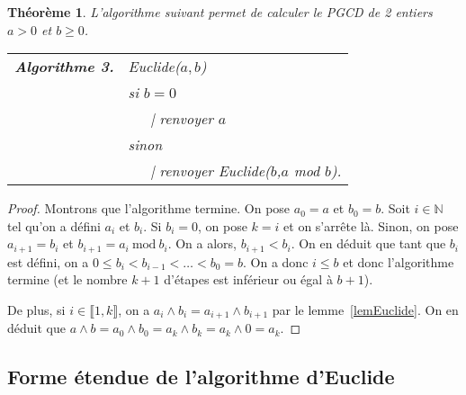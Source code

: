 \documentclass[12pt]{report}
\newtheorem*{qst}{Question}
\newtheorem*{rep}{Réponse}
\newtheorem{thm}{Théorème}[chapter]
\newcommand{\N}{\mathbb{N}}
\begin{document}
\begin{thm}\label{thmAlgorithme_d_euclide}
L'algorithme suivant permet de calculer le PGCD de 2 entiers $a>0$ et $b \geq 0$.\\

\begin{tabular}{ll}
\textbf{Algorithme 3.} & Euclide($a,b$)\\
 & si $b=0$     \\
 & \ \ \ {\rm |} renvoyer $a$  \\
 & sinon   \\ 
 & \ \ \ {\rm |  } renvoyer Euclide($b$,$a$ mod $b$).
\end{tabular}
\end{thm}

\begin{proof}
Montrons que l'algorithme termine. On pose $a_0=a$ et $b_0=b$. Soit $i\in \N$ tel qu'on a défini $a_i$ et $b_i$. Si $b_i=0$, on pose $k=i$ et on s'arrête là. Sinon, on pose $a_{i+1}=b_i$ et $b_{i+1}=a_i\mathrm{\ mod\ }b_i$. On a alors, $b_{i+1}< b_i$. On en déduit que tant que $b_i$ est défini, on a $0\leq b_i<b_{i-1}<\ldots < b_0=b$. On a donc $i\leq b$ et donc l'algorithme termine (et le nombre $k+1$ d'étapes est inférieur ou égal à $b+1$). 

De plus, si $i\in \llbracket 1,k\rrbracket$, on a $a_i\wedge b_i=a_{i+1}\wedge b_{i+1}$ par le lemme~\ref{lemEuclide}. On en déduit que $a\wedge b= a_0\wedge b_0=a_k\wedge b_k =a_k\wedge 0=a_k$.
\end{proof}



\subsection{Forme étendue de l'algorithme d'Euclide}

\end{document}
